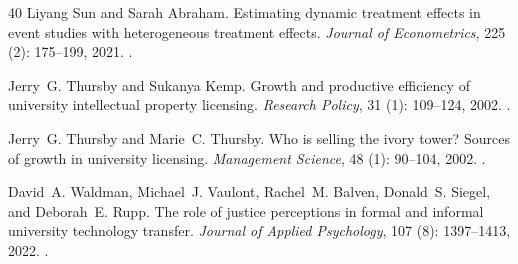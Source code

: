 \begin{thebibliography}{40}
Liyang Sun and Sarah Abraham.
\newblock Estimating dynamic treatment effects in event studies with
  heterogeneous treatment effects.
\newblock \emph{Journal of Econometrics}, 225 (2): 175--199,
  2021.
\newblock {}.

Jerry~G. Thursby and Sukanya Kemp.
\newblock Growth and productive efficiency of university intellectual property
  licensing.
\newblock \emph{Research Policy}, 31 (1): 109--124, 2002.
\newblock {}.

Jerry~G. Thursby and Marie~C. Thursby.
\newblock Who is selling the ivory tower? {Sources} of growth in university
  licensing.
\newblock \emph{Management Science}, 48 (1): 90--104, 2002.
\newblock {}.

David~A. Waldman, Michael~J. Vaulont, Rachel~M. Balven, Donald~S. Siegel, and
  Deborah~E. Rupp.
\newblock The role of justice perceptions in formal and informal university
  technology transfer.
\newblock \emph{Journal of Applied Psychology}, 107 (8):
  1397--1413, 2022.
\newblock {}.

\end{thebibliography}
